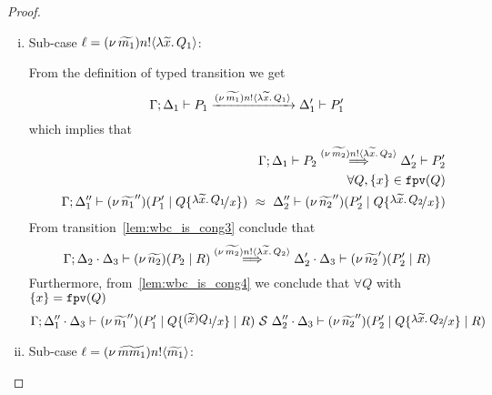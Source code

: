 \begin{proof}
\begin{enumerate}
\begin{enumerate}[i.]
					\item	Sub-case $\ell = (\nu\, \widetilde{m_1}) n ! \langle \lambda \widetilde{x}.\,Q_1 \rangle$:

							\noi From the definition of typed transition we get
							\[
								\Gamma; \Delta_1 \vdash P_1 \xrightarrow{(\nu\, \widetilde{m_1}) n ! \langle \lambda \widetilde{x}.\,Q_1 \rangle} \Delta_1' \vdash P_1'
							\]
							\noi which implies that
							\begin{eqnarray}
								&& \horel{\Gamma}{\Delta_1}{P_2}{\By{\news{\widetilde{m_2}} \bactout{n}{\abs{\widetilde{x}}{Q_2}}}}{\Delta_2'}{P_2'}
								\label{lem:wbc_is_cong3} \\
								&&\forall Q, \set{x} \in \fpv{Q} \nonumber \\
								&& \horel{\Gamma}{\Delta_1''}{\newsp{\widetilde{n_1}''}{P_1' \Par Q \subst{\abs{\widetilde{x}}{Q_1}}{x}}}
								{\ \wbc\ }
								{\Delta_2''}{\newsp{\widetilde{n_2}''}{P_2' \Par Q \subst{\abs{\widetilde{x}}{Q_2}}{x}}}
								\label{lem:wbc_is_cong4}
							\end{eqnarray}
							\noi From transition~\eqref{lem:wbc_is_cong3} conclude that 
							\[
								\Gamma; \Delta_2 \cdot \Delta_3 \vdash (\nu\, \widetilde{n_2})(P_2 \;|\; R) \stackrel{(\nu\, \widetilde{m_2}) n ! \langle \lambda \widetilde{x}.\,Q_2 \rangle}{\Longrightarrow} \Delta_2' \cdot \Delta_3 \vdash (\nu\, \widetilde{n_2}')(P_2' \;|\; R)
							\]
							\noi Furthermore, from~\eqref{lem:wbc_is_cong4} we conclude that $\forall Q$ with $\{x\} = \mathtt{fpv}(Q)$
							\[
								\horel{\Gamma}{\Delta_1'' \cat \Delta_3}{\newsp{\widetilde{n_1}''}{P_1' \Par Q \subst{(\widetilde{x}) Q_1}{x} \Par R}}
								{\ \mathcal{S}\ }
								{\Delta_2'' \cat \Delta_3}{\newsp{\widetilde{n_2}''}{P_2' \Par Q \subst{\abs{\widetilde{x}}{Q_2}}{x} \Par R}}
							\]

					\item	Sub-case $\ell = (\nu\, \widetilde{mm_1}) n ! \langle \widetilde{m_1} \rangle$:


\end{enumerate}
\end{enumerate}
\end{proof}
